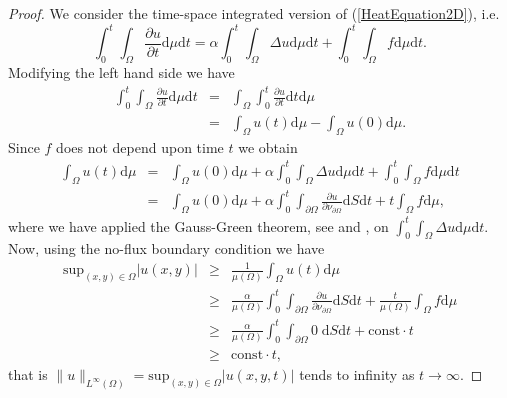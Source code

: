 \documentclass[a4paper,11pt]{article}
\theoremstyle{plain} %
\theoremstyle{definition} %
\theoremstyle{remark} %
\theoremstyle{remark}
\def\uTemp{u}
\def\volMeas{\mu}
\def\surfMeas{S}
\begin{document}
\begin{proof}
We consider the time-space integrated version of (\ref{HeatEquation2D}), i.e.
\begin{equation*}
\int_0^t \int_\Omega \frac{\partial \uTemp}{\partial t} \mathrm{d}\volMeas \mathrm{d}t = \alpha \int_0^t \int_\Omega \Delta\uTemp \mathrm{d}\volMeas \mathrm{d}t + \int_0^t \int_\Omega f \mathrm{d}\volMeas \mathrm{d}t .
\end{equation*}
Modifying the left hand side we have
\begin{eqnarray*}
\int_0^t \int_\Omega \frac{\partial \uTemp}{\partial t} \mathrm{d}\volMeas \mathrm{d}t & = &  \int_\Omega \int_0^t \frac{\partial \uTemp}{\partial t} \mathrm{d}t \mathrm{d}\volMeas \\
& = & \int_\Omega \uTemp (t) \mathrm{d}\volMeas - \int_\Omega \uTemp (0) \mathrm{d}\volMeas .
\end{eqnarray*}
Since $f$ does not depend upon time $t$ we obtain
\begin{eqnarray*}
\int_\Omega \uTemp (t) \mathrm{d}\volMeas & = & \int_\Omega \uTemp (0) \mathrm{d}\volMeas + \alpha \int_0^t \int_\Omega \Delta\uTemp \mathrm{d}\volMeas \mathrm{d}t + \int_0^t \int_\Omega f \mathrm{d}\volMeas \mathrm{d}t \\
& = & \int_\Omega \uTemp (0) \mathrm{d}\volMeas + \alpha \int_0^t \int_{\partial \Omega } \frac{\partial \uTemp}{\partial \nu_{\partial\Omega} } \mathrm{d}\surfMeas \mathrm{d}t + t \int_\Omega f \mathrm{d}\volMeas ,
\end{eqnarray*}
where we have applied the Gauss-Green theorem, see \cite[p. 288]{rudin1976} and \cite[p.312]{browder2001}, on $ \int_0^t \int_\Omega \Delta\uTemp \mathrm{d}\volMeas \mathrm{d}t $. Now, using the no-flux boundary condition we have
\begin{eqnarray*}
\mathrm{sup}_{(x,y) \in \Omega } |\uTemp(x,y) | & \geq & \frac{1}{\volMeas (\Omega )} 
\int_\Omega \uTemp (t) \mathrm{d}\volMeas \\
& \geq & \frac{\alpha}{\volMeas (\Omega )} \int_0^t \int_{\partial \Omega } \frac{\partial \uTemp}{\partial \nu_{\partial\Omega} } \mathrm{d}\surfMeas \mathrm{d}t + \frac{t}{\volMeas (\Omega )}  \int_\Omega f \mathrm{d}\volMeas \\
& \geq & \frac{\alpha}{\volMeas (\Omega )} \int_0^t \int_{\partial \Omega } 0\; \mathrm{d}\surfMeas \mathrm{d}t + \mathrm{const } \cdot t \\
& \geq &  \mathrm{const } \cdot t ,
\end{eqnarray*}
that is $ \| \uTemp \|_{L^\infty (\Omega )} =  \mathrm{sup}_{(x,y) \in \Omega } |\uTemp(x,y, t) | $ tends to infinity as $ t\rightarrow \infty $.
\end{proof}
\end{document}

